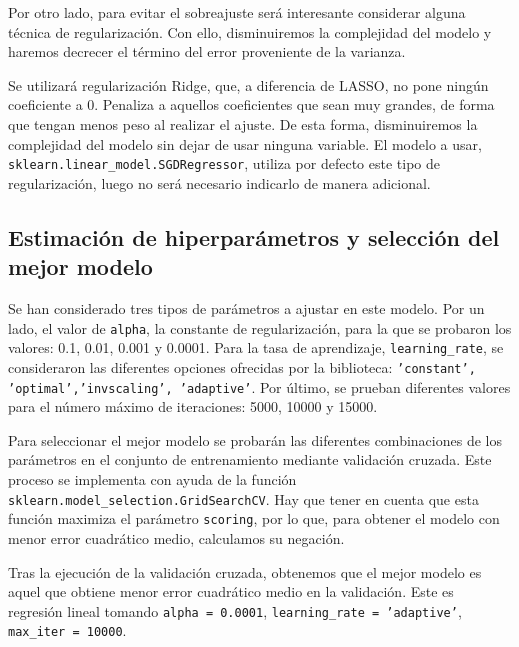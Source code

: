 \documentclass[a4paper, 20pt]{article}
\begin{document}
Por otro lado, para evitar el sobreajuste será interesante considerar alguna técnica de regularización. Con ello, disminuiremos la complejidad del modelo y haremos decrecer el término del error proveniente de la varianza.

Se utilizará regularización Ridge, que, a diferencia de LASSO, no pone ningún coeficiente a 0. Penaliza a aquellos coeficientes que sean muy grandes, de forma que tengan menos peso al realizar el ajuste. De esta forma, disminuiremos la complejidad del modelo sin dejar de usar ninguna variable. El modelo a usar, \texttt{sklearn.linear\_model.SGDRegressor}, utiliza por defecto este tipo de regularización, luego no será necesario indicarlo de manera adicional.


\subsection{Estimación de hiperparámetros y selección del mejor modelo}\label{sec:hp}
Se han considerado tres tipos de parámetros a ajustar en este modelo. Por un lado, el valor de \texttt{alpha}, la constante de regularización, para la que se probaron los valores: 0.1, 0.01, 0.001 y 0.0001. Para la tasa de aprendizaje, \texttt{learning\_rate}, se consideraron las diferentes opciones ofrecidas por la biblioteca: \texttt{'constant', 'optimal','invscaling', 'adaptive'}. Por último, se prueban diferentes valores para el número máximo de iteraciones: 5000, 10000 y 15000.

Para seleccionar el mejor modelo se probarán las diferentes combinaciones de los parámetros en el conjunto de entrenamiento mediante validación cruzada. Este proceso se implementa con ayuda de la función \texttt{sklearn.model\_selection.GridSearchCV}. Hay que tener en cuenta que esta función maximiza el parámetro \texttt{scoring}, por lo que, para obtener el modelo con menor error cuadrático medio, calculamos su negación.

Tras la ejecución de la validación cruzada, obtenemos que el mejor modelo es aquel que obtiene menor error cuadrático medio en la validación. Este es regresión lineal tomando \texttt{alpha = 0.0001}, \texttt{learning\_rate = 'adaptive'}, \texttt{max\_iter = 10000}.
\end{document}
